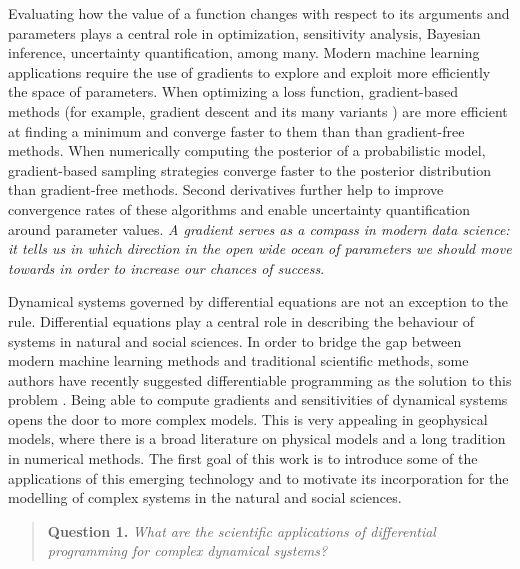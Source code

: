 Evaluating how the value of a function changes with respect to its arguments and parameters plays a central role in optimization, sensitivity analysis, Bayesian inference, uncertainty quantification, among many. 
Modern machine learning applications require the use of gradients to explore and exploit more efficiently the space of parameters. 
When optimizing a loss function, gradient-based methods (for example, gradient descent and its many variants \cite{ruder2016overview-gradient-descent}) are more efficient at finding a minimum and converge faster to them than than gradient-free methods.
When numerically computing the posterior of a probabilistic model, gradient-based sampling strategies converge faster to the posterior distribution than gradient-free methods. 
Second derivatives further help to improve convergence rates of these algorithms and enable uncertainty quantification around parameter values.
\textit{A gradient serves as a compass in modern data science: it tells us in which direction in the open wide ocean of parameters we should move towards in order to increase our chances of success}.  

Dynamical systems governed by differential equations are not an exception to the rule.
Differential equations play a central role in describing the behaviour of systems in natural and social sciences. 
In order to bridge the gap between modern machine learning methods and traditional scientific methods, some authors have recently suggested differentiable programming as the solution to this problem \cite{Ramsundar_Krishnamurthy_Viswanathan_2021, Shen_diff_modelling}. 
Being able to compute gradients and sensitivities of dynamical systems opens the door to more complex models.
This is very appealing in geophysical models, where there is a broad literature on physical models and a long tradition in numerical methods. 
The first goal of this work is to introduce some of the applications of this emerging technology and to motivate its incorporation for the modelling of complex systems in the natural and social sciences. 
\begin{quote}
    \textbf{Question 1. }
    \textit{What are the scientific applications of differential programming for complex dynamical systems?}
\end{quote}

